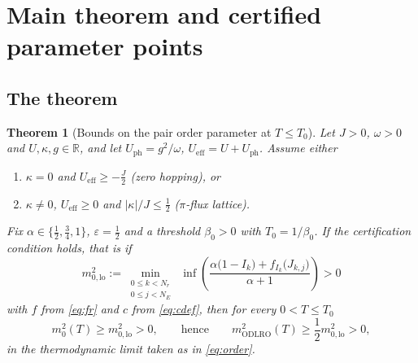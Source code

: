\documentclass[11pt]{article}
\numberwithin{equation}{section}
\newcommand{\R}{\mathbb{R}}
\newcommand{\eff}{\mathrm{eff}}
\newcommand{\ODLRO}{\mathrm{ODLRO}}
\newtheorem{theorem}{Theorem}[section]
\theoremstyle{definition}
\begin{document}
\section{Main theorem and certified parameter points}\label{sec:main}

\subsection{The theorem}

\begin{theorem}[Bounds on the pair order parameter at $T\le T_0$]\label{thm:cert}
Let $J>0$, $\omega>0$ and $U,\kappa,g\in\R$, and let $U_{\mathrm{ph}}=g^{2}/\omega$,
$U_{\eff}=U+U_{\mathrm{ph}}$. Assume either
\begin{enumerate}
\item[(i)] $\kappa=0$ and $U_{\eff}\ge-\frac{J}{2}$ (zero hopping), or
\item[(ii)] $\kappa\ne0$, $U_{\eff}\ge0$ and $|\kappa|/J\le\frac12$ ($\pi$-flux lattice).
\end{enumerate}
Fix $\alpha\in\{\frac12,\frac34,1\}$, $\varepsilon=\frac12$ and a threshold $\beta_0>0$
with $T_0=1/\beta_0$. If the certification condition holds, that is if
\begin{equation}
m_{0,\mathrm{lo}}^{2}:=\min_{\substack{0\le k<N_{r}\\0\le j<N_{E}}}\;\inf\left(\frac{\alpha\big(1-I_{k}\big)+f_{I_{k}}\big(J_{k,j}\big)}{\alpha+1}\right)>0
\label{eq:cond}
\end{equation}
with $f$ from \eqref{eq:fr} and $c$ from \eqref{eq:cdef}, then for every $0<T\le T_0$
\begin{equation}
m_{0}^{2}(T)\ge m_{0,\mathrm{lo}}^{2}>0,\qquad\text{hence}\qquad m^{2}_{\ODLRO}(T)\ge\frac12 m_{0,\mathrm{lo}}^{2}>0,
\label{eq:conclusion}
\end{equation}
in the thermodynamic limit taken as in \eqref{eq:order}.
\end{theorem}
\end{document}
